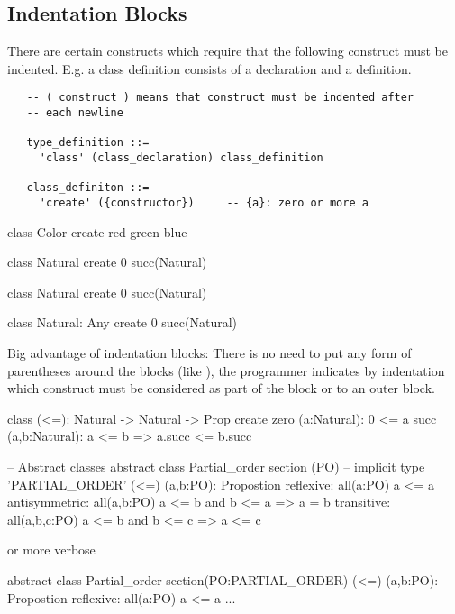 \subsection{Indentation Blocks}

There are certain constructs which require that the following construct must
be indented. E.g. a class definition consists of a declaration and a
definition.

{\small
\begin{verbatim}
   -- ( construct ) means that construct must be indented after
   -- each newline

   type_definition ::=
     'class' (class_declaration) class_definition

   class_definiton ::=
     'create' ({constructor})     -- {a}: zero or more a
\end{verbatim}
}


\begin{alba}
  class Color create red green blue

  class Natural create 0 succ(Natural)

  class Natural create
    0
    succ(Natural)

  class
    Natural: Any
  create
    0
    succ(Natural)
\end{alba}


Big advantage of indentation blocks: There is no need to put any form of
parentheses around the blocks (like ), the programmer
indicates by indentation which construct must be considered as part of the
block or to an outer block.


\begin{alba}
  class
    (<=): Natural -> Natural -> Prop
  create
    zero (a:Natural): 0 <= a
    succ (a,b:Natural): a <= b  =>  a.succ <= b.succ
\end{alba}



\begin{alba}
  -- Abstract classes
  abstract class Partial_order section (PO)  -- implicit type 'PARTIAL_ORDER'
    (<=) (a,b:PO): Propostion
    reflexive: all(a:PO)
      a <= a
    antisymmetric: all(a,b:PO)
      a <= b  and  b <= a
      =>  a = b
    transitive: all(a,b,c:PO)
      a <= b and b <= c
      => a <= c
\end{alba}
%
or more verbose
\begin{alba}
  abstract class
    Partial_order
  section(PO:PARTIAL_ORDER)
    (<=) (a,b:PO): Propostion
    reflexive: all(a:PO)
      a <= a
    ...
\end{alba}

